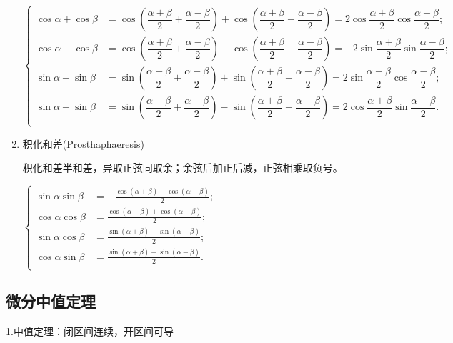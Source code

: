 \documentclass[UTF8]{ctexart}
\numberwithin{equation}{section}
\numberwithin{figure}{section}
\numberwithin{table}{section}
\newcommand\no{\noindent}
\begin{document}
\begin{spacing}{2}
\begin{enumerate}[itemindent=1.4em, label=(\arabic*)]
$\left\{\begin{aligned}
\cos\alpha+\cos\beta&=
\cos\left(\dfrac{\alpha+\beta}{2}+\dfrac{\alpha-\beta}{2}\right)
+\cos\left(\dfrac{\alpha+\beta}{2}-\dfrac{\alpha-\beta}{2}\right)
=2\cos\dfrac{\alpha+\beta}{2}\cos\dfrac{\alpha-\beta}{2};\\
\cos\alpha-\cos\beta&=
\cos\left(\dfrac{\alpha+\beta}{2}+\dfrac{\alpha-\beta}{2}\right)
-\cos\left(\dfrac{\alpha+\beta}{2}-\dfrac{\alpha-\beta}{2}\right)
=-2\sin\dfrac{\alpha+\beta}{2}\sin\dfrac{\alpha-\beta}{2};\\
\sin\alpha+\sin\beta&=
\sin\left(\dfrac{\alpha+\beta}{2}+\dfrac{\alpha-\beta}{2}\right)
+\sin\left(\dfrac{\alpha+\beta}{2}-\dfrac{\alpha-\beta}{2}\right)
=2\sin\dfrac{\alpha+\beta}{2}\cos\dfrac{\alpha-\beta}{2};\\
\sin\alpha-\sin\beta&=
\sin\left(\dfrac{\alpha+\beta}{2}+\dfrac{\alpha-\beta}{2}\right)
-\sin\left(\dfrac{\alpha+\beta}{2}-\dfrac{\alpha-\beta}{2}\right)
=2\cos\dfrac{\alpha+\beta}{2}\sin\dfrac{\alpha-\beta}{2}.\\
\end{aligned}\right.$

\item 积化和差(Prosthaphaeresis)

 \textcolor[rgb]{1,0,0}{积化和差半和差，异取正弦同取余；余弦后加正后减，正弦相乘取负号。}

\vspace{0.3cm}

$\left\{ \begin{aligned}
\sin \alpha\sin \beta&=-{\frac {\cos(\alpha+\beta)-\cos(\alpha-\beta)}{2}};\\
\cos \alpha\cos \beta&={\frac {\cos(\alpha+\beta)+\cos(\alpha-\beta)}{2}};\\
\sin \alpha\cos \beta&={\frac {\sin(\alpha+\beta)+\sin(\alpha-\beta)}{2}};\\
\cos \alpha\sin \beta&={\frac {\sin(\alpha+\beta)-\sin(\alpha-\beta)}{2}}.\\
\end{aligned}\right.$

\end{enumerate}

\subsection{微分中值定理}

\no1.中值定理：闭区间连续，开区间可导

\vspace{0.4cm}


\end{spacing}
\end{document}
